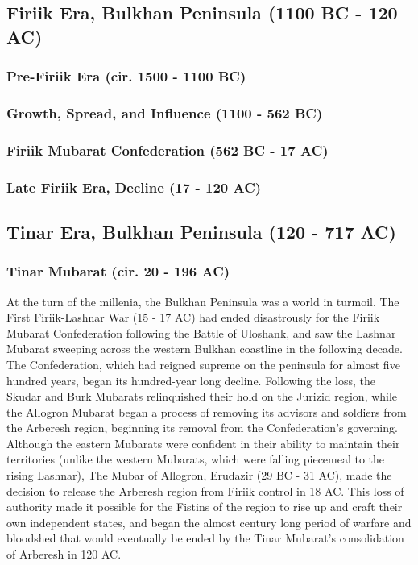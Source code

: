 \subsection{Firiik Era, Bulkhan Peninsula (1100 BC - 120 AC)}
	\subsubsection{Pre-Firiik Era (cir. 1500 - 1100 BC)}
	\subsubsection{Growth, Spread, and Influence (1100 - 562 BC)}
	\subsubsection{Firiik Mubarat Confederation (562 BC - 17 AC)}
	\subsubsection{Late Firiik Era, Decline (17 - 120 AC)}
\subsection{Tinar Era, Bulkhan Peninsula (120 - 717 AC)}
	\subsubsection{Tinar Mubarat (cir. 20 - 196 AC)}
		At the turn of the millenia, the Bulkhan Peninsula was a world in turmoil. The First Firiik-Lashnar War (15 - 17 AC) had ended disastrously for the Firiik Mubarat Confederation following the Battle of Uloshank, and saw the Lashnar Mubarat sweeping across the western Bulkhan coastline in the following decade. The Confederation, which had reigned supreme on the peninsula for almost five hundred years, began its hundred-year long decline. Following the loss, the Skudar and Burk Mubarats relinquished their hold on the Jurizid region, while the Allogron Mubarat began a process of removing its advisors and soldiers from the Arberesh region, beginning its removal from the Confederation's governing. Although the eastern Mubarats were confident in their ability to maintain their territories (unlike the western Mubarats, which were falling piecemeal to the rising Lashnar), The Mubar of Allogron, Erudazir (29 BC - 31 AC), made the decision to release the Arberesh region from Firiik control in 18 AC. This loss of authority made it possible for the Fistins of the region to rise up and craft their own independent states, and began the almost century long period of warfare and bloodshed that would eventually be ended by the Tinar Mubarat's consolidation of Arberesh in 120 AC. 
